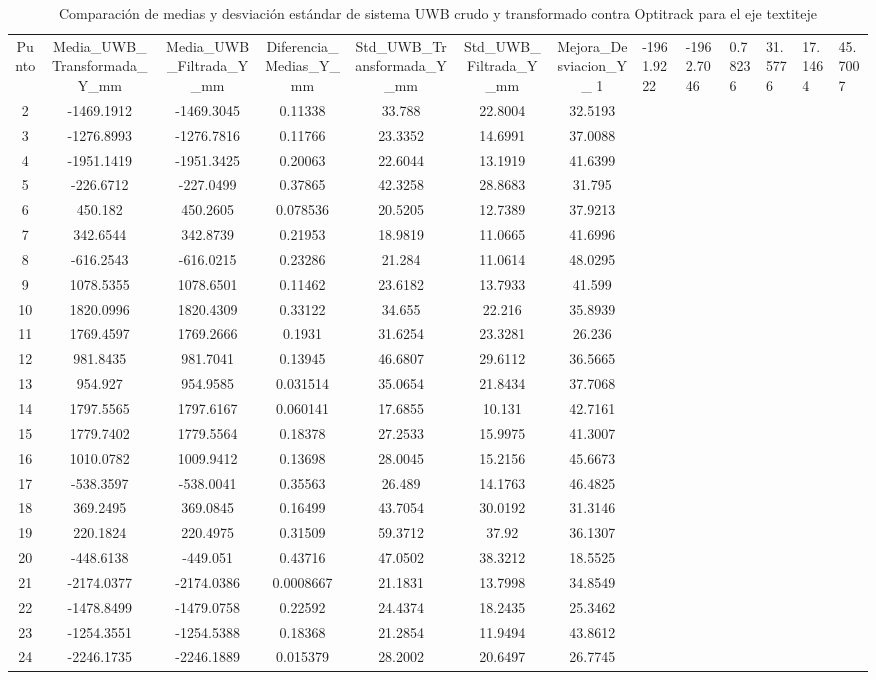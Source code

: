 \begin{table}[H]
\centering
\begin{tabular}{c c c c c c c }
\hline
Punto & Media\_UWB\_Transformada\_Y\_mm & Media\_UWB\_Filtrada\_Y\_mm & Diferencia\_Medias\_Y\_mm & Std\_UWB\_Transformada\_Y\_mm & Std\_UWB\_Filtrada\_Y\_mm & Mejora\_Desviacion\_Y\_%
1 & -1961.9222 & -1962.7046 & 0.78236 & 31.5776 & 17.1464 & 45.7007\\ 
2 & -1469.1912 & -1469.3045 & 0.11338 & 33.788 & 22.8004 & 32.5193\\ 
3 & -1276.8993 & -1276.7816 & 0.11766 & 23.3352 & 14.6991 & 37.0088\\ 
4 & -1951.1419 & -1951.3425 & 0.20063 & 22.6044 & 13.1919 & 41.6399\\ 
5 & -226.6712 & -227.0499 & 0.37865 & 42.3258 & 28.8683 & 31.795\\ 
6 & 450.182 & 450.2605 & 0.078536 & 20.5205 & 12.7389 & 37.9213\\ 
7 & 342.6544 & 342.8739 & 0.21953 & 18.9819 & 11.0665 & 41.6996\\ 
8 & -616.2543 & -616.0215 & 0.23286 & 21.284 & 11.0614 & 48.0295\\ 
9 & 1078.5355 & 1078.6501 & 0.11462 & 23.6182 & 13.7933 & 41.599\\ 
10 & 1820.0996 & 1820.4309 & 0.33122 & 34.655 & 22.216 & 35.8939\\ 
11 & 1769.4597 & 1769.2666 & 0.1931 & 31.6254 & 23.3281 & 26.236\\ 
12 & 981.8435 & 981.7041 & 0.13945 & 46.6807 & 29.6112 & 36.5665\\ 
13 & 954.927 & 954.9585 & 0.031514 & 35.0654 & 21.8434 & 37.7068\\ 
14 & 1797.5565 & 1797.6167 & 0.060141 & 17.6855 & 10.131 & 42.7161\\ 
15 & 1779.7402 & 1779.5564 & 0.18378 & 27.2533 & 15.9975 & 41.3007\\ 
16 & 1010.0782 & 1009.9412 & 0.13698 & 28.0045 & 15.2156 & 45.6673\\ 
17 & -538.3597 & -538.0041 & 0.35563 & 26.489 & 14.1763 & 46.4825\\ 
18 & 369.2495 & 369.0845 & 0.16499 & 43.7054 & 30.0192 & 31.3146\\ 
19 & 220.1824 & 220.4975 & 0.31509 & 59.3712 & 37.92 & 36.1307\\ 
20 & -448.6138 & -449.051 & 0.43716 & 47.0502 & 38.3212 & 18.5525\\ 
21 & -2174.0377 & -2174.0386 & 0.0008667 & 21.1831 & 13.7998 & 34.8549\\ 
22 & -1478.8499 & -1479.0758 & 0.22592 & 24.4374 & 18.2435 & 25.3462\\ 
23 & -1254.3551 & -1254.5388 & 0.18368 & 21.2854 & 11.9494 & 43.8612\\ 
24 & -2246.1735 & -2246.1889 & 0.015379 & 28.2002 & 20.6497 & 26.7745\\ 
\hline
\end{tabular}
\caption{Comparación de medias y desviación estándar de sistema UWB crudo y transformado contra Optitrack para el eje textit{eje}}
\end{table}
